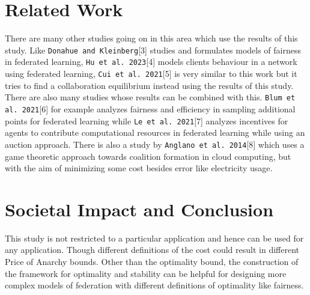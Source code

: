 \documentclass{article}
\begin{document}
\section{Related Work}
There are many other studies going on in this area which use the results of this study. Like \verb~Donahue and Kleinberg~[3] studies and formulates models of fairness in federated learning, \verb~Hu et al. 2023~[4] models clients behaviour in a network using federated learning, \verb~Cui et al. 2021~[5] is very similar to this work but it tries to find a collaboration equilibrium instead using the results of this study. There are also many studies whose results can be combined with this. \verb~Blum et al. 2021~[6] for example analyzes fairness and efficiency in sampling additional points for federated learning while \verb~Le et al. 2021~[7] analyzes incentives for agents to contribute computational resources in federated learning while using an auction approach. There is also a study by \verb~Anglano et al. 2014~[8] which uses a game theoretic approach towards coalition formation in cloud computing, but with the aim of minimizing some cost besides error like electricity usage.

\section{Societal Impact and Conclusion}
This study is not restricted to a particular application and hence can be used for any application. Though different definitions of the cost could result in different Price of Anarchy bounds. Other than the optimality bound, the construction of the framework for optimality and stability can be helpful for designing more complex models of federation with different definitions of optimality like fairness.
\end{document}
